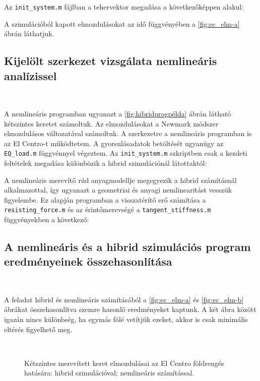 Az \verb|init_system.m| fájlban a tehervektor megadása  a következőképpen alakul:
 
 
A szimulációból kapott elmozdulásokat az idő függvényében a \ref{fig:ec_elm-a} ábrán láthatjuk.


\subsection{Kijelölt szerkezet vizsgálata nemlineáris analízissel}

{\ }

A nemlineáris programban ugyanazt a \ref{fig:hibridprogpélda} ábrán látható kétszintes keretet számoltuk. Az elmozdulásokat a Newmark módszer elmozdulásos változatával számoltuk. A szerkezetre a nemlineáris programban is az El Centro-t működtetem. A gyorsulásadatok betöltését ugyanúgy az \verb|EQ_load.m| függvénnyel végeztem. Az \verb|init_system.m| szkriptben csak a kezdeti feltételek megadása különbözik a hibrid szimulációnál látottaktól:

 

A nemlineáris merevítő rúd  anyagmodellje megegyezik a hibrid számításnál alkalmazottal, így ugyanazt a geometriai és anyagi nemlinearitást vesszük figyelembe. Ez alapján programban a visszatérítő erő számítása a \verb|resisting_force.m| és az érintőmerevségé a \verb|tangent_stiffness.m| függvényekben a következő:





\subsection{A nemlineáris és a hibrid szimulációs program eredményeinek összehasonlítása}

{\ }

A feladat hibrid és nemlineáris számításából a \ref{fig:ec_elm-a} és \ref{fig:ec_elm-b} ábrákat összehasonlítva szemre hasonló eredményeket kaptunk. A két ábra között igazán nincs  különbség,  ha egymás fölé vetítjük ezeket, akkor is csak minimális  eltérés figyelhető meg. 

\begin{figure}[h!]%
\centering
{}%
\\
%
\caption[Kétszintes merevített keret elmozdulásai.]{Kétszintes merevített keret elmozdulásai az El Centro földrengés hatására:
 hibrid szimulációval;
 nemlineáris számítással.}%
\label{fig:ec_elm}%
\end{figure}

